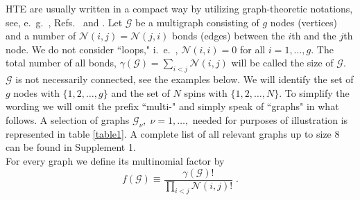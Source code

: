 \documentclass[aps,twocolumn,groupedaddress]{revtex4}
\begin{document}
HTE are usually written in a compact way by utilizing
graph-theoretic notations, see, e.~g.~, Refs.~
and .
Let ${\mathcal G}$
be a multigraph consisting of $g$ nodes (vertices) and
a number of ${\mathcal N}(i,j)={\mathcal N}(j,i)$ bonds (edges) between the
$i$th and the $j$th node. We do not consider ``loops,"
i.~e.~, ${\mathcal N}(i,i)=0$ for all $i=1,\ldots,g$. The total number
of all bonds, $\gamma({\mathcal G})=\sum_{i<j}{\mathcal N}(i,j)$
will be called the size of ${\mathcal G}$. ${\mathcal
G}$ is not necessarily connected, see the examples below. We will
identify the set of $g$ nodes with $\{1,2,\ldots,g\}$ and the set of
$N$ spins with $\{1,2,\ldots,N\}$. To simplify the wording we will
omit the prefix ``multi-" and simply speak of ``graphs"
in what follows. A selection of graphs ${\mathcal
G}_\nu,\;\nu=1,\ldots,$ needed for purposes of illustration is
represented in table \ref{table1}.
A complete list of all relevant graphs up to size $8$ can be found in
Supplement 1.\cite{supp1}\\

For every graph we define its multinomial factor by
\begin{equation}\label{dfac}
f({\mathcal G})\equiv \frac{\gamma({\mathcal G})!}
{\prod_{i<j}{\mathcal N}(i,j)!} \;.
\end{equation}
\end{document}
